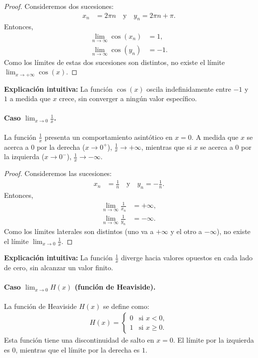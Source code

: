 \documentclass[12pt, a4paper]{article}
\theoremstyle{rioplatense}
\begin{document}
\begin{proof}
Consideremos dos sucesiones:
\begin{align*}
    x_n &= 2\pi n \quad \text{y} \quad y_n = 2\pi n + \pi.
\end{align*}
Entonces,
\begin{align*}
    \lim_{n \to \infty} \cos(x_n) &= 1, \\
    \lim_{n \to \infty} \cos(y_n) &= -1.
\end{align*}
Como los límites de estas dos sucesiones son distintos, no existe el límite \(\lim_{x \to +\infty} \cos(x)\).
\end{proof}

\textbf{Explicación intuitiva:} La función \(\cos(x)\) oscila indefinidamente entre \(-1\) y \(1\) a medida que \(x\) crece, sin converger a ningún valor específico.

\paragraph{Caso \(\lim_{x \to 0} \frac{1}{x}\).}
La función \(\frac{1}{x}\) presenta un comportamiento asintótico en \(x = 0\). A medida que \(x\) se acerca a \(0\) por la derecha (\(x \to 0^+\)), \(\frac{1}{x} \to +\infty\), mientras que si \(x\) se acerca a \(0\) por la izquierda (\(x \to 0^-\)), \(\frac{1}{x} \to -\infty\).

\begin{proof}
Consideremos las sucesiones:
\begin{align*}
    x_n &= \frac{1}{n} \quad \text{y} \quad y_n = -\frac{1}{n}.
\end{align*}
Entonces,
\begin{align*}
    \lim_{n \to \infty} \frac{1}{x_n} &= +\infty, \\
    \lim_{n \to \infty} \frac{1}{y_n} &= -\infty.
\end{align*}
Como los límites laterales son distintos (uno va a \(+\infty\) y el otro a \(-\infty\)), no existe el límite \(\lim_{x \to 0} \frac{1}{x}\).
\end{proof}

\textbf{Explicación intuitiva:} La función \(\frac{1}{x}\) diverge hacia valores opuestos en cada lado de cero, sin alcanzar un valor finito.

\paragraph{Caso \(\lim_{x \to 0} H(x)\) (función de Heaviside).}
La función de Heaviside \(H(x)\) se define como:
\begin{align*}
    H(x) =
    \begin{cases}
        0 & \text{si } x < 0, \\
        1 & \text{si } x \geq 0.
    \end{cases}
\end{align*}
Esta función tiene una discontinuidad de salto en \(x = 0\). El límite por la izquierda es \(0\), mientras que el límite por la derecha es \(1\).
\end{document}
